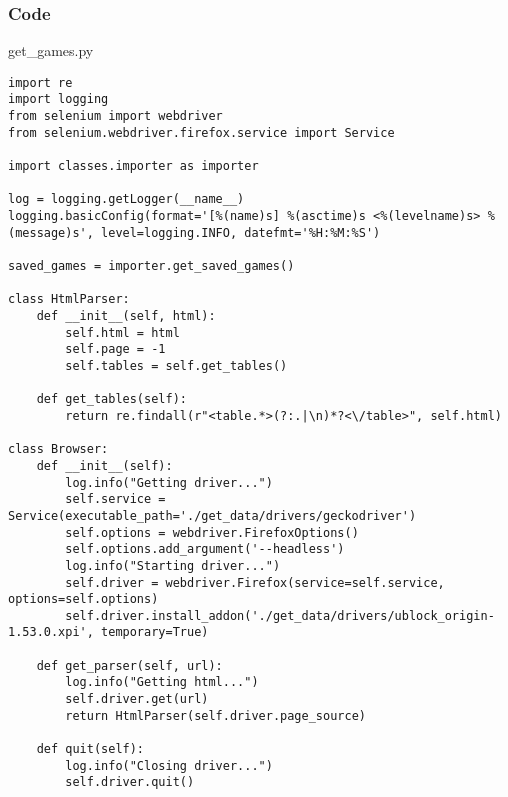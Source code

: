 \documentclass{beamer}
\begin{document}

\begin{frame}[fragile]
    \frametitle{Code}
    \scriptsize
    get\_games.py \newline
    \fontsize{3pt}{5pt}\selectfont
    \begin{verbatim}
import re
import logging
from selenium import webdriver
from selenium.webdriver.firefox.service import Service

import classes.importer as importer

log = logging.getLogger(__name__)
logging.basicConfig(format='[%(name)s] %(asctime)s <%(levelname)s> %(message)s', level=logging.INFO, datefmt='%H:%M:%S')

saved_games = importer.get_saved_games()

class HtmlParser:
    def __init__(self, html):
        self.html = html
        self.page = -1
        self.tables = self.get_tables()
    
    def get_tables(self):
        return re.findall(r"<table.*>(?:.|\n)*?<\/table>", self.html)

class Browser:
    def __init__(self):
        log.info("Getting driver...")
        self.service = Service(executable_path='./get_data/drivers/geckodriver')
        self.options = webdriver.FirefoxOptions()
        self.options.add_argument('--headless')
        log.info("Starting driver...")
        self.driver = webdriver.Firefox(service=self.service, options=self.options)
        self.driver.install_addon('./get_data/drivers/ublock_origin-1.53.0.xpi', temporary=True)

    def get_parser(self, url):
        log.info("Getting html...")
        self.driver.get(url)
        return HtmlParser(self.driver.page_source)
    
    def quit(self):
        log.info("Closing driver...")
        self.driver.quit()
    \end{verbatim}
\end{frame}
\end{document}
